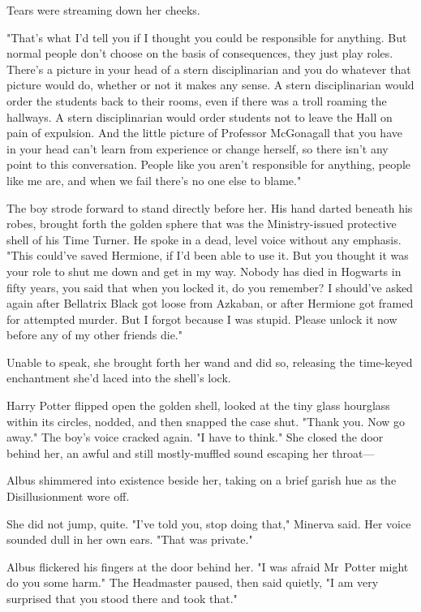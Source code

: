 Tears were streaming down her cheeks.

"That's what I'd tell you if I thought you could be responsible for anything.
But normal people don't choose on the basis of consequences, they just play
roles. There's a picture in your head of a stern disciplinarian and you do
whatever that picture would do, whether or not it makes any sense. A stern
disciplinarian would order the students back to their rooms, even if there was
a troll roaming the hallways. A stern disciplinarian would order students not
to leave the Hall on pain of expulsion. And the little picture of Professor
McGonagall that you have in your head can't learn from experience or change
herself, so there isn't any point to this conversation. People like you aren't
responsible for anything, people like me are, and when we fail there's no one
else to blame."

The boy strode forward to stand directly before her. His hand darted beneath
his robes, brought forth the golden sphere that was the Ministry-issued
protective shell of his Time Turner. He spoke in a dead, level voice without
any emphasis. "This could've saved Hermione, if I'd been able to use it. But
you thought it was your role to shut me down and get in my way. Nobody has died
in Hogwarts in fifty years, you said that when you locked it, do you remember?
I should've asked again after Bellatrix Black got loose from Azkaban, or after
Hermione got framed for attempted murder. But I forgot because I was stupid.
Please unlock it now before any of my other friends die."

Unable to speak, she brought forth her wand and did so, releasing the
time-keyed enchantment she'd laced into the shell's lock.

Harry Potter flipped open the golden shell, looked at the tiny glass hourglass
within its circles, nodded, and then snapped the case shut. "Thank you. Now go
away." The boy's voice cracked again. "I have to think."
\later
She closed the door behind her, an awful and still mostly-muffled sound
escaping her throat---

Albus shimmered into existence beside her, taking on a brief garish hue as the
Disillusionment wore off.

She did not jump, quite. "I've told you, stop doing that," Minerva said. Her
voice sounded dull in her own ears. "That was private."

Albus flickered his fingers at the door behind her. "I was afraid Mr~Potter
might do you some harm." The Headmaster paused, then said quietly, "I am very
surprised that you stood there and took that."

